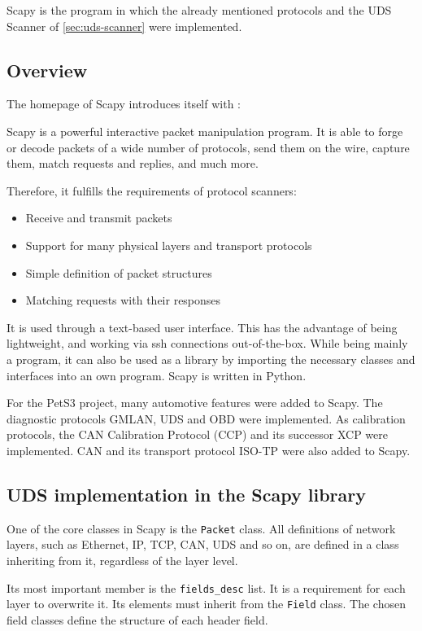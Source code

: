 Scapy is the program in which the already mentioned protocols and the UDS Scanner of \autoref{sec:uds-scanner} were implemented.

\subsection{Overview}
The homepage of Scapy introduces itself with \cite{scapy}:
\begin{displayquote}
Scapy is a powerful interactive packet manipulation program. It is able to forge or decode packets of a wide number of protocols, send them on the wire, capture them, match requests and replies, and much more.
\end{displayquote}

Therefore, it fulfills the requirements of protocol scanners:
\begin{itemize}
    \item Receive and transmit packets
    \item Support for many physical layers and transport protocols
    \item Simple definition of packet structures
    \item Matching requests with their responses
\end{itemize}

It is used through a text-based user interface. This has the advantage of being lightweight, and working via ssh connections out-of-the-box. While being mainly a program, it can also be used as a library by importing the necessary classes and interfaces into an own program. Scapy is written in Python.

For the PetS3 project, many automotive features were added to Scapy. The diagnostic protocols GMLAN, UDS and OBD were implemented. As calibration protocols, the CAN Calibration Protocol (CCP) and its successor XCP were implemented. CAN and its transport protocol ISO-TP were also added to Scapy.

\subsection{UDS implementation in the Scapy library}
\label{subsec:uds-scapy}

One of the core classes in Scapy is the \texttt{Packet} class. All definitions of network layers, such as Ethernet, IP, TCP, CAN, UDS and so on, are defined in a class inheriting from it, regardless of the layer level.

Its most important member is the \texttt{fields_desc} list. It is a requirement for each layer to overwrite it. Its elements must inherit from the \texttt{Field} class. The chosen field classes define the structure of each header field.

